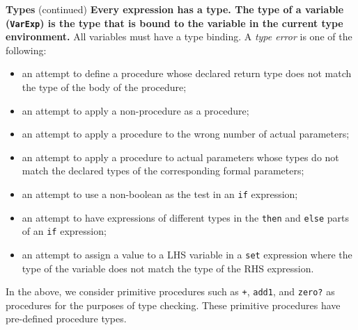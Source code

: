 \begin{minipage}[t]{\sw}
\slidenumber
\LARGE
{\bf Types} (continued)\exx
{\bf Every expression has a type.
The type of a variable (\verb'VarExp')
is the type that is bound to the variable
in the current type environment.}
All variables must have a type binding.\exx
A {\em type error} is one of the following:
\begin{itemize}
\itemsep -0.5ex
\item an attempt to define a procedure whose declared return type
      does not match the type of the body of the procedure;
\item an attempt to apply a non-procedure as a procedure;
\item an attempt to apply a procedure to the wrong number
      of actual parameters;
\item an attempt to apply a procedure to actual parameters whose types
      do not match the declared types
      of the corresponding formal parameters;
\item an attempt to use a non-boolean as the test in an \verb'if' expression;
\item an attempt to have expressions of different types
      in the \verb'then' and \verb'else' parts of an \verb'if' expression;
\item an attempt to assign a value
      to a LHS variable in a \verb'set' expression
      where the type of the variable does not match the type
      of the RHS expression.
\end{itemize}
In the above, we consider primitive procedures
such as \verb'+', \verb'add1', and \verb'zero?' as procedures
for the purposes of type checking.
These primitive procedures have pre-defined procedure types.
\end{minipage}
